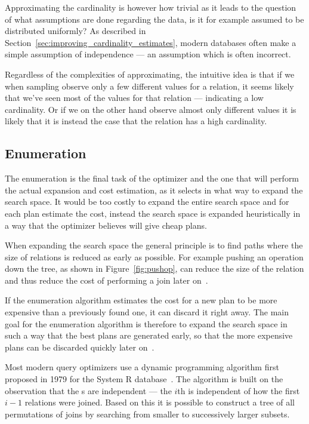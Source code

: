 Approximating the cardinality is however how trivial as it leads to the question
of what assumptions are done regarding the data, is it for example assumed to be
distributed uniformly? As described in
Section~\ref{sec:improving_cardinality_estimates}, modern databases often make a
simple assumption of independence --- an assumption which is often incorrect.

Regardless of the complexities of approximating, the intuitive idea is that if
we when sampling observe only a few different values for a relation, it
seems likely that we've seen most of the values for that relation --- indicating
a low cardinality. Or if we on the other hand observe almost only different
values it is likely that it is instead the case that the relation has a high
cardinality.

\subsection{Enumeration}
The enumeration is the final task of the optimizer and the one that will perform
the actual expansion and cost estimation, as it selects in what way to expand
the search space. It would be too costly to expand the entire search space and
for each plan estimate the cost, instead the search space is expanded
heuristically in a way that the optimizer believes will give cheap plans.

When expanding the search space the general principle is to find paths where the
size of relations is reduced as early as possible. For example pushing an
operation down the tree, as shown in Figure~\ref{fig:pushop}, can reduce the
size of the relation and thus reduce the cost of performing a join later
on~\cite[p. 772-774]{garcia-molina_2002_database_dstcb}.

If the enumeration algorithm estimates the cost for a new plan to be more
expensive than a previously found one, it can discard it right away. The main
goal for the enumeration algorithm is therefore to expand the search space in
such a way that the best plans are generated early, so that the more expensive
plans can be discarded quickly later on~\cite{nica_2012_analyzing_aqoppojea}.

Most modern query optimizers use a dynamic programming algorithm first proposed
in 1979 for the System R database~\cite{selinger_1979_access_apsiardms}. The
algorithm is built on the observation that the s are independent ---
the $i$th  is independent of how the first $i-1$ relations were
joined. Based on this it is possible to construct a tree of all permutations of
joins by searching from smaller to successively larger subsets.

